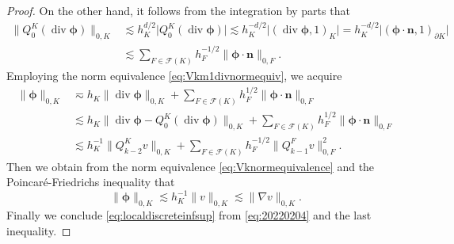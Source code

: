 \documentclass[10pt]{amsart}
\renewcommand{\div}{\operatorname{div}}
\numberwithin{equation}{section}
\begin{document}
\begin{proof}
On the other hand, it follows from the integration by parts that
\begin{align*}
\|Q_0^K(\div\boldsymbol{\phi})\|_{0,K}&\lesssim h_{K}^{d/2}\big|Q_0^K(\div\boldsymbol{\phi})\big|\lesssim h_{K}^{-d/2}\big|(\div\boldsymbol{\phi},1)_{K}\big|=h_{K}^{-d/2}\big|(\boldsymbol{\phi}\cdot\boldsymbol{n},1)_{\partial K}\big| \\
&\lesssim \sum_{F\in\mathcal F(K)}h_F^{-1/2}\|\boldsymbol{\phi}\cdot\boldsymbol{n}\|_{0,F}.
\end{align*}
Employing the norm equivalence \eqref{eq:Vkm1divnormequiv},
we acquire
\begin{align*}
\|\boldsymbol{\phi}\|_{0,K}&\eqsim h_K\|\div\boldsymbol{\phi}\|_{0,K} +\sum_{F\in\mathcal F(K)}h_F^{1/2}\|\boldsymbol{\phi}\cdot\boldsymbol{n}\|_{0,F} \\
&\lesssim h_K\|\div\boldsymbol{\phi}-Q_0^K(\div\boldsymbol{\phi})\|_{0,K} +\sum_{F\in\mathcal F(K)}h_F^{1/2}\|\boldsymbol{\phi}\cdot\boldsymbol{n}\|_{0,F} \\
&\lesssim h_K^{-1}\|Q_{k-2}^Kv\|_{0,K} +\sum_{F\in\mathcal F(K)}h_F^{-1/2}\|Q_{k-1}^Fv\|_{0,F}^2.    
\end{align*}
Then we obtain from the norm equivalence \eqref{eq:Vknormequivalence} and the Poincar\'e-Friedrichs  inequality \cite[(2.14)]{BrennerSung2018} that
$$
\|\boldsymbol{\phi}\|_{0,K}\lesssim h_K^{-1}\|v\|_{0,K}\lesssim \|\nabla v\|_{0,K}.    
$$
Finally we conclude \eqref{eq:localdiscreteinfsup} from \eqref{eq:20220204} and the last inequality.
\end{proof}
\end{document}
